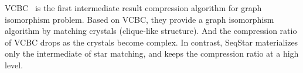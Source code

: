 VCBC~\cite{DBLP:journals/pvldb/QiaoZC17} is the first intermediate result compression algorithm for graph isomorphism problem.
Based on VCBC, they provide a graph isomorphism algorithm by matching crystals (clique-like structure).
And the compression ratio of VCBC drops as the crystals become complex.
In contrast, SeqStar materializes only the intermediate of star matching, and keeps the compression ratio at a high level.



